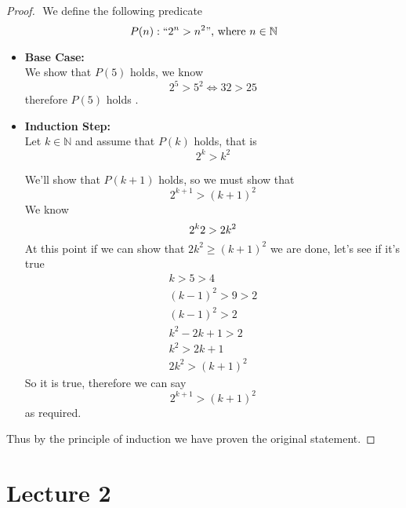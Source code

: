 \documentclass[11pt]{book}
\begin{document}
\begin{proof}
    $ $\newline
    We define the following predicate
    \[
    P(n): `` 2^{n} > n^2  "\text{, where } n \in \mathbb{N} 
    \]
    \begin{itemize}
        \item \textbf{Base Case:}\\
            We show that $P(5)$ holds, we know 
            \[
            2^{5} > 5^2 \Leftrightarrow 32 > 25
            \]
            therefore $P\left(5\right) $ holds .
        \item \textbf{Induction Step:}\\
            Let $k \in \mathbb{N}$ and assume that $P(k)$ holds, that is 
            \[
            2^{k} > k^2 
            \]
            
            We'll show that $P(k + 1)$ holds, so we must show that 
            \[
                2^{k + 1} > \left( k + 1 \right) ^2 
            \]
            We know 
            \[
                2^{k} 2 > 2k^2  \\ 
            \]
            At this point if we can show that $2k^2 \ge \left( k + 1 \right) ^2 $ we are done, let's see if it's true
            \begin{gather*}
                k > 5 > 4\\
                \left( k - 1 \right) ^2 > 9 > 2\\
                \left( k - 1 \right) ^2 > 2\\
                k^2  - 2k + 1 > 2\\
                k^2 > 2k  + 1\\
                2k^2 > \left( k + 1 \right) ^2 
            \end{gather*}
            So it is true, therefore we can say 
            \[
                2^{k + 1} > \left( k + 1 \right) ^2 
            \]
            as required. 
    \end{itemize}
    Thus by the principle of induction we have proven the original statement.
\end{proof}




\chapter{Lecture 2}%
\label{chp:lecture_2}
\end{document}

